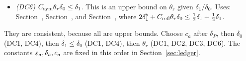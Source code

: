 \begin{detail}
\begin{step}
\begin{itemize}
\item \emph{(DC6)} $C_{\rm sym}\theta_r\delta_0\le\delta_1$. This is an upper bound on $\theta_r$ given $\delta_1/\delta_0$. Uses: Section~, Section~, and Section~, where $2\delta_1^\flat+C_{\rm refl}\theta_r\delta_0\le\frac12\delta_1+\frac12\delta_1$.
\end{itemize}
They are consistent, because all are upper bounds. Choose $c_a$ after $\delta_P$, then $\delta_0$ (DC1, DC4), then $\delta_1\le\delta_0$ (DC1, DC4), then $\theta_r$ (DC1, DC2, DC3, DC6). The constants $\varepsilon_a,\delta_a,c_a$ are fixed in this order in Section~\ref{sec:ledger}.
\end{step}
\end{detail}

